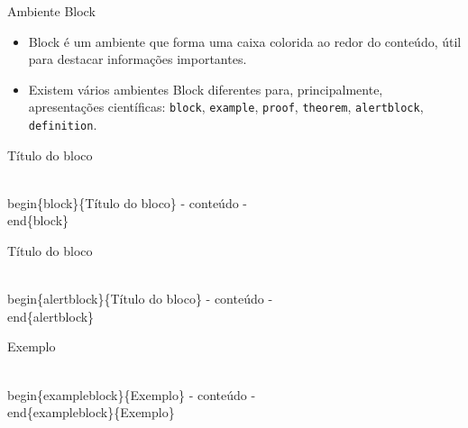 \begin{frame}{Ambiente Block}
    \begin{itemize}
    \item Block é um ambiente que forma uma caixa colorida ao redor do conteúdo, útil para destacar informações importantes.
    \item Existem vários ambientes Block diferentes para, principalmente, apresentações científicas: \verb|block|, \verb|example|, \verb|proof|, \verb|theorem|, \verb|alertblock|, \verb|definition|.
    \end{itemize}

\newpage

    \begin{block}{Título do bloco}
\begin{semiverbatim}
\\begin\{block\}\{Título do bloco\}
  - conteúdo -
\\end\{block\}
\end{semiverbatim}
    \end{block}
   
   \begin{alertblock}{Título do bloco}
\begin{semiverbatim}
\\begin\{alertblock\}\{Título do bloco\}
  - conteúdo -
\\end\{alertblock\}
\end{semiverbatim}
    \end{alertblock}

    \begin{exampleblock}{Exemplo}
\begin{semiverbatim}
\\begin\{exampleblock\}\{Exemplo\}
  - conteúdo -
\\end\{exampleblock\}\{Exemplo\}
\end{semiverbatim}
    \end{exampleblock}

\end{frame}

